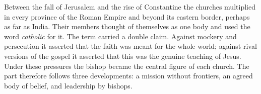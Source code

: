 \begin{partoverview}
Between the fall of Jerusalem and the rise of Constantine the churches multiplied in every province of
the Roman Empire and beyond its eastern border, perhaps as far as India. Their members thought of
themselves as one body and used the word \emph{catholic} for it. The term carried a double claim.
Against mockery and persecution it asserted that the faith was meant for the whole world; against rival
versions of the gospel it asserted that this was the genuine teaching of Jesus. Under these pressures
the bishop became the central figure of each church. The part therefore follows three developments: a
mission without frontiers, an agreed body of belief, and leadership by bishops.
\end{partoverview}
